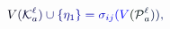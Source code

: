 \documentclass[12pt]{article}
\begin{document}
\makeatletter
\renewcommand*{\@textcolor}[3]{%
  \protect\leavevmode
  \begingroup
    \color#1{#2}#3%
  \endgroup
}
\makeatother
\begin{displaymath}
\mathcolor[RGB]{0,0,15}{V} \mathcolor[RGB]{0,0,30}{(} \mathcal { \mathcolor[RGB]{0,0,45}{K} } _ { \mathcolor[RGB]{0,0,60}{a} } ^ { \mathcolor[RGB]{0,0,75}{\ell} } \mathcolor[RGB]{0,0,90}{)} \mathcolor[RGB]{0,0,105}{\cup} \mathcolor[RGB]{0,0,120}{\{} \mathcolor[RGB]{0,0,135}{\eta} _ { \mathcolor[RGB]{0,0,150}{1} } \mathcolor[RGB]{0,0,165}{\}} \mathcolor[RGB]{0,0,180}{=} \mathcolor[RGB]{0,0,195}{\sigma} _ { \mathcolor[RGB]{0,0,210}{i} \mathcolor[RGB]{0,0,225}{j} } \mathcolor[RGB]{0,0,240}{(} \mathcolor[RGB]{0,0,255}{V} \mathcolor[RGB]{0,15,0}{(} \mathcal { \mathcolor[RGB]{0,15,15}{P} } _ { \mathcolor[RGB]{0,15,30}{a} } ^ { \mathcolor[RGB]{0,15,45}{\ell} } \mathcolor[RGB]{0,15,60}{)} \mathcolor[RGB]{0,15,75}{)} \mathcolor[RGB]{0,15,90}{,}
\end{displaymath}
\end{document}
